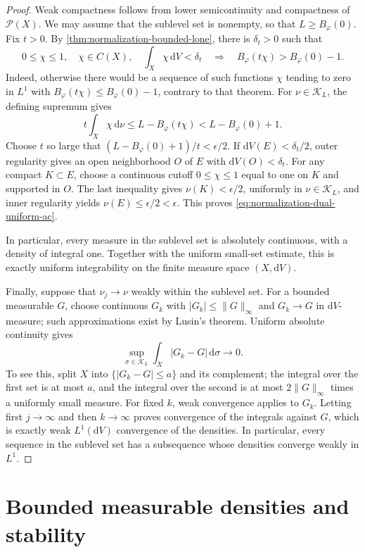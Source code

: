 \begin{proof}
Weak compactness follows from lower semicontinuity and compactness of $\mathcal P(X)$. We may assume that the sublevel set is nonempty, so that $L\geq B_\varphi(0)$.
Fix $t>0$. By \cref{thm:normalization-bounded-lone}, there is $\delta_t>0$ such that
\[
 0\leq\chi\leq1,\quad \chi\in C(X),\quad
 \int_X\chi\,\mathrm{d}V<\delta_t
 \quad\Longrightarrow\quad
 B_\varphi(t\chi)>B_\varphi(0)-1.
\]
Indeed, otherwise there would be a sequence of such functions $\chi$ tending to zero in $L^1$ with $B_\varphi(t\chi)\leq B_\varphi(0)-1$, contrary to that theorem. For $\nu\in\mathcal K_L$, the defining supremum gives
\[
 t\int_X\chi\,\mathrm{d}\nu
 \leq L-B_\varphi(t\chi)
 <L-B_\varphi(0)+1.
\]
Choose $t$ so large that $(L-B_\varphi(0)+1)/t<\epsilon/2$. If $\mathrm{d}V(E)<\delta_t/2$, outer regularity gives an open neighborhood $O$ of $E$ with $\mathrm{d}V(O)<\delta_t$. For any compact $K\subset E$, choose a continuous cutoff $0\leq\chi\leq1$ equal to one on $K$ and supported in $O$. The last inequality gives $\nu(K)<\epsilon/2$, uniformly in $\nu\in\mathcal K_L$, and inner regularity yields $\nu(E)\leq\epsilon/2<\epsilon$. This proves \eqref{eq:normalization-dual-uniform-ac}.

In particular, every measure in the sublevel set is absolutely continuous, with a density of integral one. Together with the uniform small-set estimate, this is exactly uniform integrability on the finite measure space $(X,\mathrm{d}V)$.

Finally, suppose that $\nu_j\to\nu$ weakly within the sublevel set. For a bounded measurable $G$, choose continuous $G_k$ with
$|G_k|\leq\|G\|_\infty$ and $G_k\to G$ in $\mathrm{d}V$-measure; such approximations exist by Lusin's theorem. Uniform absolute continuity gives
\[
 \sup_{\sigma\in\mathcal K_L}\int_X|G_k-G|\,\mathrm{d}\sigma\longrightarrow0.
\]
To see this, split $X$ into $\{|G_k-G|\leq a\}$ and its complement; the integral over the first set is at most $a$, and the integral over the second is at most $2\|G\|_\infty$ times a uniformly small measure. For fixed $k$, weak convergence applies to $G_k$. Letting first $j\to\infty$ and then $k\to\infty$ proves convergence of the integrals against $G$, which is exactly weak $L^1(\mathrm{d}V)$ convergence of the densities. In particular, every sequence in the sublevel set has a subsequence whose densities converge weakly in $L^1$.
\end{proof}

\section{Bounded measurable densities and stability}


